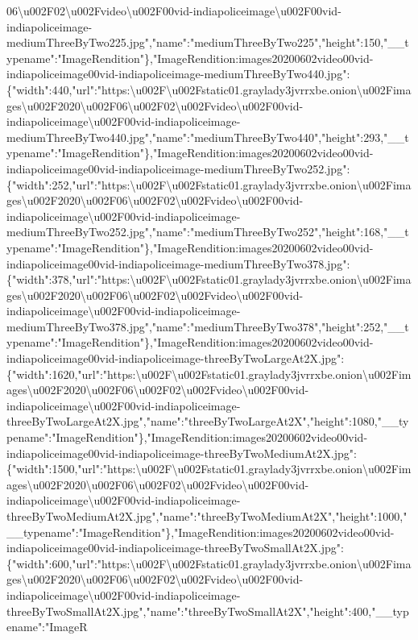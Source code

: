 06\textbackslash{}u002F02\textbackslash{}u002Fvideo\textbackslash{}u002F00vid-indiapoliceimage\textbackslash{}u002F00vid-indiapoliceimage-mediumThreeByTwo225.jpg","name":"mediumThreeByTwo225","height":150,"\_\_typename":"ImageRendition"\},"ImageRendition:images20200602video00vid-indiapoliceimage00vid-indiapoliceimage-mediumThreeByTwo440.jpg":\{"width":440,"url":"https:\textbackslash{}u002F\textbackslash{}u002Fstatic01.graylady3jvrrxbe.onion\textbackslash{}u002Fimages\textbackslash{}u002F2020\textbackslash{}u002F06\textbackslash{}u002F02\textbackslash{}u002Fvideo\textbackslash{}u002F00vid-indiapoliceimage\textbackslash{}u002F00vid-indiapoliceimage-mediumThreeByTwo440.jpg","name":"mediumThreeByTwo440","height":293,"\_\_typename":"ImageRendition"\},"ImageRendition:images20200602video00vid-indiapoliceimage00vid-indiapoliceimage-mediumThreeByTwo252.jpg":\{"width":252,"url":"https:\textbackslash{}u002F\textbackslash{}u002Fstatic01.graylady3jvrrxbe.onion\textbackslash{}u002Fimages\textbackslash{}u002F2020\textbackslash{}u002F06\textbackslash{}u002F02\textbackslash{}u002Fvideo\textbackslash{}u002F00vid-indiapoliceimage\textbackslash{}u002F00vid-indiapoliceimage-mediumThreeByTwo252.jpg","name":"mediumThreeByTwo252","height":168,"\_\_typename":"ImageRendition"\},"ImageRendition:images20200602video00vid-indiapoliceimage00vid-indiapoliceimage-mediumThreeByTwo378.jpg":\{"width":378,"url":"https:\textbackslash{}u002F\textbackslash{}u002Fstatic01.graylady3jvrrxbe.onion\textbackslash{}u002Fimages\textbackslash{}u002F2020\textbackslash{}u002F06\textbackslash{}u002F02\textbackslash{}u002Fvideo\textbackslash{}u002F00vid-indiapoliceimage\textbackslash{}u002F00vid-indiapoliceimage-mediumThreeByTwo378.jpg","name":"mediumThreeByTwo378","height":252,"\_\_typename":"ImageRendition"\},"ImageRendition:images20200602video00vid-indiapoliceimage00vid-indiapoliceimage-threeByTwoLargeAt2X.jpg":\{"width":1620,"url":"https:\textbackslash{}u002F\textbackslash{}u002Fstatic01.graylady3jvrrxbe.onion\textbackslash{}u002Fimages\textbackslash{}u002F2020\textbackslash{}u002F06\textbackslash{}u002F02\textbackslash{}u002Fvideo\textbackslash{}u002F00vid-indiapoliceimage\textbackslash{}u002F00vid-indiapoliceimage-threeByTwoLargeAt2X.jpg","name":"threeByTwoLargeAt2X","height":1080,"\_\_typename":"ImageRendition"\},"ImageRendition:images20200602video00vid-indiapoliceimage00vid-indiapoliceimage-threeByTwoMediumAt2X.jpg":\{"width":1500,"url":"https:\textbackslash{}u002F\textbackslash{}u002Fstatic01.graylady3jvrrxbe.onion\textbackslash{}u002Fimages\textbackslash{}u002F2020\textbackslash{}u002F06\textbackslash{}u002F02\textbackslash{}u002Fvideo\textbackslash{}u002F00vid-indiapoliceimage\textbackslash{}u002F00vid-indiapoliceimage-threeByTwoMediumAt2X.jpg","name":"threeByTwoMediumAt2X","height":1000,"\_\_typename":"ImageRendition"\},"ImageRendition:images20200602video00vid-indiapoliceimage00vid-indiapoliceimage-threeByTwoSmallAt2X.jpg":\{"width":600,"url":"https:\textbackslash{}u002F\textbackslash{}u002Fstatic01.graylady3jvrrxbe.onion\textbackslash{}u002Fimages\textbackslash{}u002F2020\textbackslash{}u002F06\textbackslash{}u002F02\textbackslash{}u002Fvideo\textbackslash{}u002F00vid-indiapoliceimage\textbackslash{}u002F00vid-indiapoliceimage-threeByTwoSmallAt2X.jpg","name":"threeByTwoSmallAt2X","height":400,"\_\_typename":"ImageR